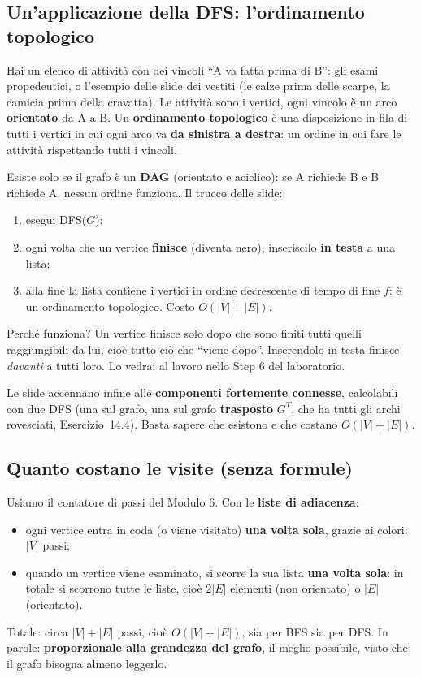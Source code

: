 \subsection*{Un'applicazione della DFS: l'ordinamento topologico}

Hai un elenco di attività con dei vincoli ``A va fatta prima di B'': gli esami
propedeutici, o l'esempio delle slide dei vestiti (le calze prima delle scarpe, la
camicia prima della cravatta). Le attività sono i vertici, ogni vincolo è un arco
\textbf{orientato} da A a B. Un \textbf{ordinamento topologico} è una disposizione in fila
di tutti i vertici in cui ogni arco va \textbf{da sinistra a destra}: un ordine in cui
fare le attività rispettando tutti i vincoli.

Esiste solo se il grafo è un \textbf{DAG} (orientato e aciclico): se A richiede B e B
richiede A, nessun ordine funziona. Il trucco delle slide:
\begin{passopasso}
\begin{enumerate}
  \item esegui DFS($G$);
  \item ogni volta che un vertice \textbf{finisce} (diventa nero), inseriscilo \textbf{in
        testa} a una lista;
  \item alla fine la lista contiene i vertici in ordine decrescente di tempo di fine $f$:
        è un ordinamento topologico. Costo $O(|V| + |E|)$.
\end{enumerate}
\end{passopasso}
Perché funziona? Un vertice finisce solo dopo che sono finiti tutti quelli raggiungibili
da lui, cioè tutto ciò che ``viene dopo''. Inserendolo in testa finisce \emph{davanti} a
tutti loro. Lo vedrai al lavoro nello Step 6 del laboratorio.

Le slide accennano infine alle \textbf{componenti fortemente connesse}, calcolabili con due
DFS (una sul grafo, una sul grafo \textbf{trasposto} $G^T$, che ha tutti gli archi
rovesciati, Esercizio~14.4). Basta sapere che esistono e che costano $O(|V|+|E|)$.

\subsection*{Quanto costano le visite (senza formule)}

Usiamo il contatore di passi del Modulo 6. Con le \textbf{liste di adiacenza}:
\begin{itemize}
  \item ogni vertice entra in coda (o viene visitato) \textbf{una volta sola}, grazie ai
        colori: $|V|$ passi;
  \item quando un vertice viene esaminato, si scorre la sua lista \textbf{una volta sola}:
        in totale si scorrono tutte le liste, cioè $2|E|$ elementi (non orientato) o
        $|E|$ (orientato).
\end{itemize}
Totale: circa $|V| + |E|$ passi, cioè $O(|V| + |E|)$, sia per BFS sia per DFS. In
parole: \textbf{proporzionale alla grandezza del grafo}, il meglio possibile, visto che il
grafo bisogna almeno leggerlo.

